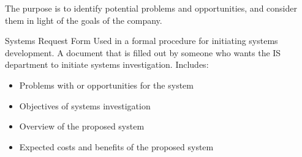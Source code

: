 \documentclass[\main/notes.tex]{subfiles}
\begin{document}
			The purpose is to identify potential problems and opportunities, and consider them in light of the goals of the company.

			\begin{definition}{Systems Request Form}
				Used in a formal procedure for initiating systems development. A document that is filled out by someone who wants the IS department to initiate systems investigation. Includes:
				\begin{itemize}[nosep]
					\item Problems with or opportunities for the system
					\item Objectives of systems investigation
					\item Overview of the proposed system
					\item Expected costs and benefits of the proposed system
				\end{itemize}
			\end{definition}
\end{document}
